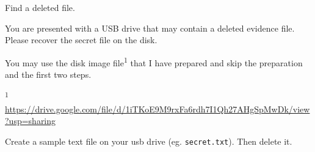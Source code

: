 \documentclass[a4paper, 10pt]{article}
\begin{document}
\begin{problem}
Find a deleted file.

\noindent You are presented with a USB drive that may contain a deleted evidence file.
Please recover the secret file on the disk.
\end{problem}

\myspace

\par You may use the disk image file\textsuperscript{1} that I have prepared and skip the preparation and the first two steps.

\par\noindent \textsuperscript{1} \url{https://drive.google.com/file/d/1iTKoE9M9rxFa6rdh7I1Qh27AHgSpMwDk/view?usp=sharing}

\myspace

\par Create a sample text file on your usb drive (eg. \texttt{secret.txt}). Then delete it.

\myspace
\end{document}
